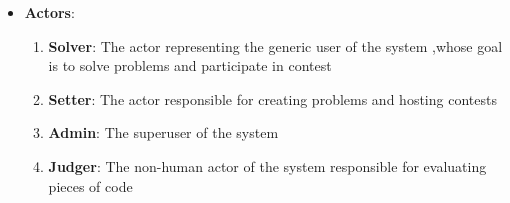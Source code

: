 \begin{itemize}[]

    \item \textbf{Actors}: 
    \begin{enumerate}
        \item \textbf{Solver}: The actor representing the generic user of the system ,whose goal is to solve problems and participate in contest
        \item \textbf{Setter}: The actor responsible for creating problems and hosting contests
        \item \textbf{Admin}: The superuser of the system 
        \item \textbf{Judger}: The non-human actor of the system responsible for evaluating pieces of code   
    
    \end{enumerate}


\end{itemize}

